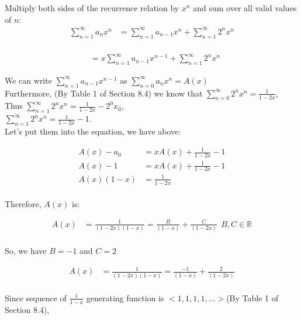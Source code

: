 \documentclass[12pt]{article}
\begin{document}
Multiply both sides of the recurrence relation by \( x^n \) and sum over all valid values of \( n \):
\begin{align*}
\sum_{n=1}^{\infty} a_n x^n &= \sum_{n=1}^{\infty} a_{n-1} x^n + \sum_{n=1}^{\infty} 2^n x^n \\
\end{align*}

\begin{align*}
&= x\sum_{n=1}^{\infty} a_{n-1} x^{n-1} + \sum_{n=1}^{\infty} 2^n x^n
\end{align*}

We can write \( \sum_{n=1}^{\infty} a_{n-1} x^{n-1}\) as \( \sum_{n=0}^{\infty} a_{n} x^{n} = A(x) \) \\

Furthermore, (By Table 1 of Section 8.4) we know that  \( \sum_{n=0}^{\infty} 2^n x^n = \frac{1}{1-2x} \),\\

Thus \( \sum_{n=1}^{\infty} 2^n x^n = \frac{1}{1-2x} - 2^0x_0\),\\

\( \sum_{n=1}^{\infty} 2^n x^n = \frac{1}{1-2x} - 1\).\\

Let's put them into the equation, we have above:

\begin{align*}
A(x)-a_{0} &= xA(x) + \frac{1}{1-2x} - 1\\
A(x)-1 &= xA(x) + \frac{1}{1-2x} - 1\\
A(x)(1-x) &= \frac{1}{1-2x}\\
\end{align*}

Therefore, \( A(x) \) is:

\begin{align*}
A(x)&= \frac{1}{(1-2x)(1-x)} = \frac{B}{(1-x)} + \frac{C}{(1-2x)}  \ \ B,C \in \mathbb{R}\\
\end{align*}

So, we have \( B=-1\) and \(C=2\)

\begin{align*}
A(x)&= \frac{1}{(1-2x)(1-x)} = \frac{-1}{(1-x)} + \frac{2}{(1-2x)}  \\
\end{align*}

Since sequence of \( \frac{1}{1-x} \) generating function is \( <1, 1, 1, 1, \dots> \)(By Table 1 of Section 8.4),\\
\end{document}
